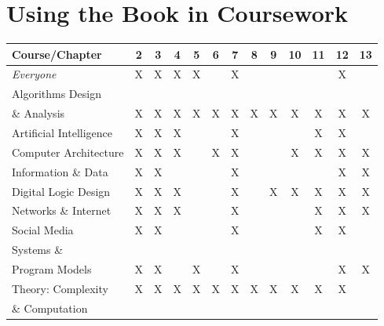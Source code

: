 \documentclass{article}
\begin{document}
\section*{Using the Book in Coursework}

\bigskip

{\small
\begin{tabular}{|l||c|c|c|c|c|c|c|c|c|c|c|c|}
\hline
{\bf Course}/{\bf Chapter}
   & 2 & 3 & 4 & 5 & 6 & 7 & 8 & 9 & 10 & 11 & 12 & 13 \\
\hline
\hline
{\em Everyone} 
   & X & X & X & X &  & X &  &  &  &  & X &  \\
\hline
Algorithms Design   &  &  &  &  &  &  &  &  &  &  &  & \\
 \& Analysis   & X & X & X & X & X & X & X & X & X & X & X & X \\ 
\hline
Artificial Intelligence
   & X & X & X &  &  & X &  &  &  & X & X &  \\
\hline
Computer Architecture 
   & X & X & X &  & X & X &  &  & X & X & X & X \\
\hline
Information \& Data 
   & X & X &  &  &  & X &  &  &  &  & X & X \\
\hline
Digital Logic Design 
   & X & X & X &  &  & X &  & X & X & X & X & X \\
\hline
Networks \& Internet
   & X & X & X &  &  & X &  &  &  & X & X & X \\
\hline
Social Media 
   & X & X &  &  &  & X &  &  &  & X & X &  \\
\hline
Systems \&    &  &  &  &  &  &  &  &  &  &  &  & \\
Program Models 
   & X & X &  & X &  & X &  &  &  &  & X & X \\
\hline
Theory: Complexity 
   & X & X & X & X & X & X & X & X & X & X & X &  \\
\& Computation    &  &  &  &  &  &  &  &  &  &  &  & \\
\hline
\end{tabular}
}
\end{document}
